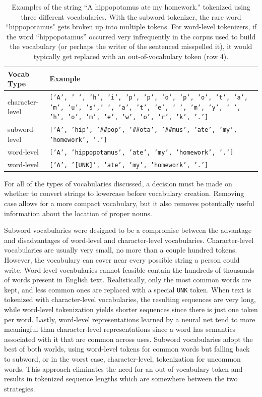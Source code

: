 \begin{table}[h]
    \centering
    \caption{Examples of the string ``A hippopotamus ate my homework." tokenized using three different vocabularies. With the subword tokenizer, the rare word ``hippopotamus" gets broken up into multiple tokens. For word-level tokenizers, if the word ``hippopotamus'' occurred very infrequently in the corpus used to build the vocabulary (or perhaps the writer of the sentenced misspelled it), it would typically get replaced with an out-of-vocabulary token (row 4).}
    \label{tab:tokenization}
    \begin{tabular}{l|p{5in}}
        Vocab Type & Example \\
        \hline
        character-level & \texttt{['A', ' ', 'h', 'i', 'p', 'p', 'o', 'p', 'o', 't', 'a', 'm', 'u', 's',' ', 'a', 't', 'e', ' ', 'm', 'y', ' ', 'h', 'o', 'm', 'e', 'w', 'o', 'r', 'k', '.']}\\
        subword-level & \texttt{['A', 'hip', '\#\#pop', '\#\#ota', '\#\#mus', 'ate', 'my', 'homework', '.']}\\
        word-level & \texttt{['A', 'hippopotamus', 'ate', 'my', 'homework', '.']}\\
        word-level & \texttt{['A', '[UNK]', 'ate', 'my', 'homework', '.']}\\
    \end{tabular}
\end{table}

For all of the types of vocabularies discussed, a decision must be made on whether to convert strings to lowercase before vocabulary creation.
Removing case allows for a more compact vocabulary, but it also removes potentially useful information about the location of proper nouns.

Subword vocabularies were designed to be a compromise between the advantage and disadvantages of word-level and character-level vocabularies.
Character-level vocabularies are usually very small, no more than a couple hundred tokens.
However, the vocabulary can cover near every possible string a person could write.
Word-level vocabularies cannot feasible contain the hundreds-of-thousands of words present in English text.
Realistically, only the most common words are kept, and less common ones are replaced with a special \texttt{UNK} token.
When text is tokenized with character-level vocabularies, the resulting sequences are very long, while word-level tokenization yields shorter sequences since there is just one token per word.
Lastly, word-level representations learned by a neural net tend to more meaningful than character-level representations since a word has semantics associated with it that are common across uses.
Subword vocabularies adopt the best of both worlds, using word-level tokens for common words but falling back to subword, or in the worst case, character-level, tokenization for uncommon words.
This approach eliminates the need for an out-of-vocabulary token and results in tokenized sequence lengths which are somewhere between the two strategies.


